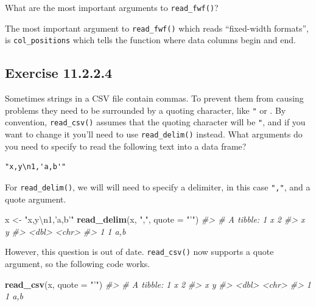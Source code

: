 \documentclass[]{book}
\newenvironment{Shaded}{\begin{snugshade}}{\end{snugshade}}
\newcommand{\CharTok}[1]{\textcolor[rgb]{0.31,0.60,0.02}{#1}}
\newcommand{\CommentTok}[1]{\textcolor[rgb]{0.56,0.35,0.01}{\textit{#1}}}
\newcommand{\DataTypeTok}[1]{\textcolor[rgb]{0.13,0.29,0.53}{#1}}
\newcommand{\KeywordTok}[1]{\textcolor[rgb]{0.13,0.29,0.53}{\textbf{#1}}}
\newcommand{\NormalTok}[1]{#1}
\newcommand{\StringTok}[1]{\textcolor[rgb]{0.31,0.60,0.02}{#1}}
\theoremstyle{plain}
\theoremstyle{remark}
\begin{document}
What are the most important arguments to \texttt{read\_fwf()}?

The most important argument to \texttt{read\_fwf()} which reads ``fixed-width formats'', is \texttt{col\_positions} which tells the function where data columns begin and end.

\hypertarget{exercise-11.2.2.4}{%
\subsection*{\texorpdfstring{Exercise {11.2.2.4}}{Exercise 11.2.2.4}}\label{exercise-11.2.2.4}}

Sometimes strings in a CSV file contain commas.
To prevent them from causing problems they need to be surrounded by a quoting character, like \texttt{"} or \texttt{\textquotesingle{}}.
By convention, \texttt{read\_csv()} assumes that the quoting character will be \texttt{"}, and if you want to change it you'll need to use \texttt{read\_delim()} instead.
What arguments do you need to specify to read the following text into a data frame?

\begin{verbatim}
"x,y\n1,'a,b'"
\end{verbatim}

For \texttt{read\_delim()}, we will will need to specify a delimiter, in this case \texttt{","}, and a quote argument.

\begin{Shaded}
\begin{Highlighting}[]
\NormalTok{x <-}\StringTok{ "x,y}\CharTok{\textbackslash{}n}\StringTok{1,'a,b'"}
\KeywordTok{read_delim}\NormalTok{(x, }\StringTok{","}\NormalTok{, }\DataTypeTok{quote =} \StringTok{"'"}\NormalTok{)}
\CommentTok{#> # A tibble: 1 x 2}
\CommentTok{#>       x y    }
\CommentTok{#>   <dbl> <chr>}
\CommentTok{#> 1     1 a,b}
\end{Highlighting}
\end{Shaded}

However, this question is out of date. \texttt{read\_csv()} now supports a quote argument, so the following code works.

\begin{Shaded}
\begin{Highlighting}[]
\KeywordTok{read_csv}\NormalTok{(x, }\DataTypeTok{quote =} \StringTok{"'"}\NormalTok{)}
\CommentTok{#> # A tibble: 1 x 2}
\CommentTok{#>       x y    }
\CommentTok{#>   <dbl> <chr>}
\CommentTok{#> 1     1 a,b}
\end{Highlighting}
\end{Shaded}
\end{document}
